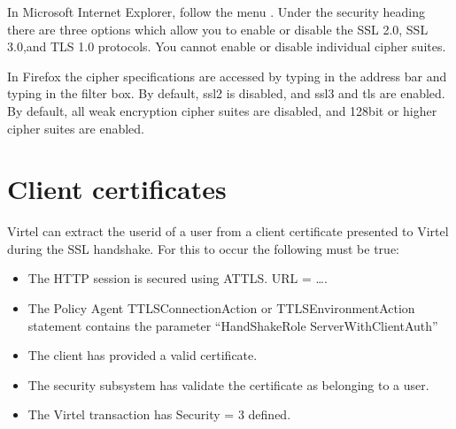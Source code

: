 \documentclass[letterpaper,10pt,english]{sphinxmanual}
\begin{document}
\sphinxAtStartPar
In Microsoft Internet Explorer, follow the menu . Under the security heading there are three options which allow you to enable or disable the SSL 2.0, SSL 3.0,and TLS 1.0 protocols. You cannot enable or disable individual cipher suites.

\sphinxAtStartPar
In Firefox the cipher specifications are accessed by typing  in the address bar and typing  in the filter box. By default, ssl2 is disabled, and ssl3 and tls are enabled. By default, all weak encryption cipher suites are disabled, and 128\sphinxhyphen{}bit or higher cipher suites are enabled.

\ignorespaces 

\section{Client certificates}
\label{\detokenize{connectivity_guide:client-certificates}}\label{\detokenize{connectivity_guide:index-161}}
\sphinxAtStartPar
Virtel can extract the userid of a user from a client certificate presented to Virtel during the SSL handshake. For this to occur the following must be true:\sphinxhyphen{}
\begin{itemize}
\item {} 
\sphinxAtStartPar
The HTTP session is secured using AT\sphinxhyphen{}TLS. URL = ….

\item {} 
\sphinxAtStartPar
The Policy Agent TTLSConnectionAction or TTLSEnvironmentAction statement contains the parameter “HandShakeRole ServerWithClientAuth”

\item {} 
\sphinxAtStartPar
The client has provided a valid certificate.

\item {} 
\sphinxAtStartPar
The security subsystem has validate the certificate as belonging to a user.

\item {} 
\sphinxAtStartPar
The Virtel transaction has Security = 3 defined.

\end{itemize}
\end{document}
